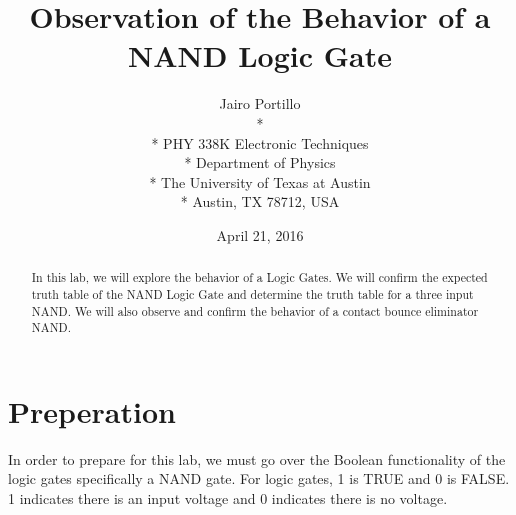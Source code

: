 \documentclass[11pt,letterpaper,onecolumn]{article}
\begin{document}

\title{\bf Observation of the Behavior of a NAND Logic Gate}

\author{
 Jairo Portillo \\*
  \\*
 PHY 338K Electronic Techniques \\*
 Department of Physics \\*
 The University of Texas at Austin \\*
 Austin, TX 78712, USA
}
\date{April 21, 2016}


\maketitle


\begin{abstract}

In this lab, we will explore the behavior of a Logic Gates. We will confirm the expected truth table of the NAND Logic Gate and determine the truth table for a three input NAND. We will also observe and confirm the behavior of a contact bounce eliminator NAND.

\end{abstract}



\section{Preperation}

 In order to prepare for this lab, we must go over the Boolean functionality of the logic gates specifically a NAND gate. For logic gates, 1 is TRUE and 0 is FALSE. 1 indicates there is an input voltage and 0 indicates there is no voltage. 
 
\end{document}
